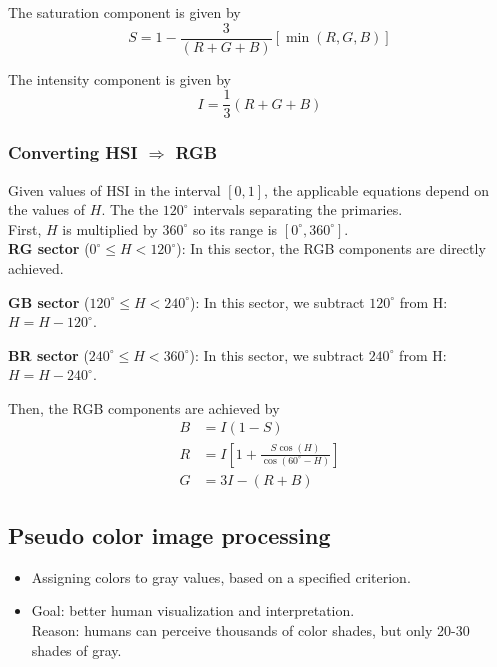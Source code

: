 The saturation component is given by
\begin{equation}
	S = 1 - \frac{3}{(R+G+B)} \left[ \min(R,G,B) \right]
\end{equation}

The intensity component is given by
\begin{equation}
	I = \frac{1}{3}(R+G+B)
\end{equation}

\subsubsection{Converting HSI $\Rightarrow$ RGB }
Given values of HSI in the interval $[0,1]$, the applicable equations depend on the values of $H$. The the $120^{\circ}$ intervals separating the primaries.\\

First, $H$ is multiplied by $360^{\circ}$ so its range is $[0^{\circ},360^{\circ}]$. \\

\textbf{RG sector} ($0^{\circ} \leq H < 120^{\circ}$): In this sector, the RGB components are directly achieved.

\textbf{GB sector} ($120^{\circ} \leq H < 240^{\circ}$): In this sector, we subtract $120^{\circ}$ from H: $H = H-120^{\circ}$.

\textbf{BR sector} ($240^{\circ} \leq H < 360^{\circ}$): In this sector, we subtract $240^{\circ}$ from H: $H = H-240^{\circ}$.

Then, the RGB components are achieved by
\begin{align}
	B &= I(1-S) \\
	R &= I \left[ 1 + \frac{S \cos(H)}{\cos(60^{\circ} - H)} \right] \\
	G &= 3I - (R+B)
\end{align}

\subsection{Pseudo color image processing }
\begin{itemize}
	\item Assigning colors to gray values, based on a specified criterion.
	\item Goal: better human visualization and interpretation. \\
			Reason: humans can perceive thousands of color shades, but only 20-30 shades of gray.
\end{itemize}

